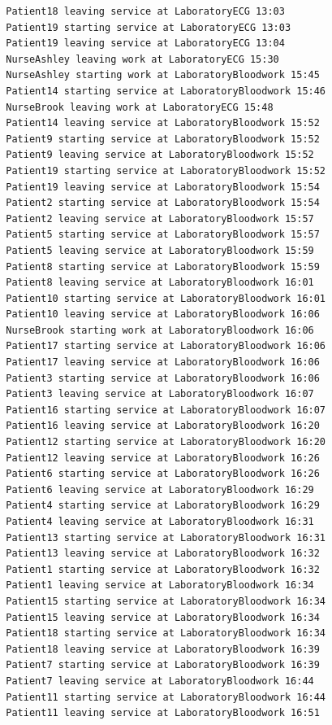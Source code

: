 \documentclass[12pt]{article}
\begin{document}
\begin{verbatim}
		Patient18 leaving service at LaboratoryECG 13:03
		Patient19 starting service at LaboratoryECG 13:03
		Patient19 leaving service at LaboratoryECG 13:04
		NurseAshley leaving work at LaboratoryECG 15:30
		NurseAshley starting work at LaboratoryBloodwork 15:45
		Patient14 starting service at LaboratoryBloodwork 15:46
		NurseBrook leaving work at LaboratoryECG 15:48
		Patient14 leaving service at LaboratoryBloodwork 15:52
		Patient9 starting service at LaboratoryBloodwork 15:52
		Patient9 leaving service at LaboratoryBloodwork 15:52
		Patient19 starting service at LaboratoryBloodwork 15:52
		Patient19 leaving service at LaboratoryBloodwork 15:54
		Patient2 starting service at LaboratoryBloodwork 15:54
		Patient2 leaving service at LaboratoryBloodwork 15:57
		Patient5 starting service at LaboratoryBloodwork 15:57
		Patient5 leaving service at LaboratoryBloodwork 15:59
		Patient8 starting service at LaboratoryBloodwork 15:59
		Patient8 leaving service at LaboratoryBloodwork 16:01
		Patient10 starting service at LaboratoryBloodwork 16:01
		Patient10 leaving service at LaboratoryBloodwork 16:06
		NurseBrook starting work at LaboratoryBloodwork 16:06
		Patient17 starting service at LaboratoryBloodwork 16:06
		Patient17 leaving service at LaboratoryBloodwork 16:06
		Patient3 starting service at LaboratoryBloodwork 16:06
		Patient3 leaving service at LaboratoryBloodwork 16:07
		Patient16 starting service at LaboratoryBloodwork 16:07
		Patient16 leaving service at LaboratoryBloodwork 16:20
		Patient12 starting service at LaboratoryBloodwork 16:20
		Patient12 leaving service at LaboratoryBloodwork 16:26
		Patient6 starting service at LaboratoryBloodwork 16:26
		Patient6 leaving service at LaboratoryBloodwork 16:29
		Patient4 starting service at LaboratoryBloodwork 16:29
		Patient4 leaving service at LaboratoryBloodwork 16:31
		Patient13 starting service at LaboratoryBloodwork 16:31
		Patient13 leaving service at LaboratoryBloodwork 16:32
		Patient1 starting service at LaboratoryBloodwork 16:32
		Patient1 leaving service at LaboratoryBloodwork 16:34
		Patient15 starting service at LaboratoryBloodwork 16:34
		Patient15 leaving service at LaboratoryBloodwork 16:34
		Patient18 starting service at LaboratoryBloodwork 16:34
		Patient18 leaving service at LaboratoryBloodwork 16:39
		Patient7 starting service at LaboratoryBloodwork 16:39
		Patient7 leaving service at LaboratoryBloodwork 16:44
		Patient11 starting service at LaboratoryBloodwork 16:44
		Patient11 leaving service at LaboratoryBloodwork 16:51
		
		\end{verbatim}
		
\end{document}

